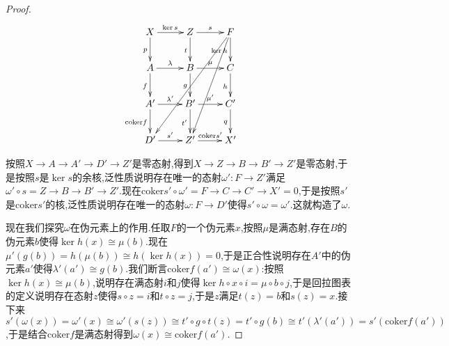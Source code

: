 \begin{enumerate}
\begin{proof}
    	$$\xymatrix{X\ar[r]^{\ker s}\ar[d]_p&Z\ar[r]^s\ar[d]_t&F\ar[d]_{\ker h}\ar[dddl]\ar[dddll]\\A\ar[r]^{\lambda}\ar[d]_f&B\ar[r]^{\mu}\ar[d]_g&C\ar[d]_h\\A'\ar[r]^{\lambda'}\ar[d]_{\mathrm{coker}f}&B'\ar[r]^{\mu'}\ar[d]_{t'}&C'\ar[d]_q\\D'\ar[r]^{s'}&Z'\ar[r]^{\mathrm{coker}s'}&X'}$$
    	
    	按照$X\to A\to A'\to D'\to Z'$是零态射,得到$X\to Z\to B\to B'\to Z'$是零态射,于是按照$s$是$\ker s$的余核,泛性质说明存在唯一的态射$\omega':F\to Z'$满足$\omega'\circ s=Z\to B\to B'\to Z'$.现在$\mathrm{coker}s'\circ\omega'=F\to C\to C'\to X'=0$,于是按照$s'$是$\mathrm{coker}s'$的核,泛性质说明存在唯一的态射$\omega:F\to D'$使得$s'\circ\omega=\omega'$.这就构造了$\omega$.
    	
    	现在我们探究$\omega$在伪元素上的作用.任取$F$的一个伪元素$x$,按照$\mu$是满态射,存在$B$的伪元素$b$使得$\ker h(x)\cong\mu(b)$.现在$\mu'(g(b))=h(\mu(b))\cong h(\ker h(x))=0$,于是正合性说明存在$A'$中的伪元素$a'$使得$\lambda'(a')\cong g(b)$.我们断言$\mathrm{coker}f(a')\cong\omega(x)$:按照$\ker h(x)\cong\mu(b)$,说明存在满态射$i$和$j$使得$\ker h\circ x\circ i=\mu\circ b\circ j$,于是回拉图表的定义说明存在态射$z$使得$s\circ z=i$和$t\circ z=j$,于是$z$满足$t(z)=b$和$s(z)=x$.接下来$s'(\omega(x))=\omega'(x)\cong\omega'(s(z))\cong t'\circ g\circ t(z)=t'\circ g(b)\cong t'(\lambda'(a'))=s'(\mathrm{coker}f(a'))$,于是结合$\mathrm{coker}f$是满态射得到$\omega(x)\cong \mathrm{coker}f(a')$.
    	

\end{proof}
\end{enumerate}
